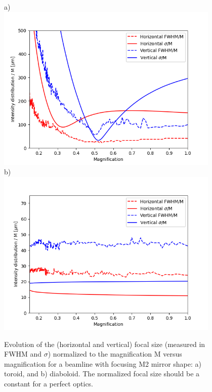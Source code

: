 \documentclass{iucr}              %
\begin{document}
\begin{figure}\label{fig:scan}
\flushleft
a)\\
\centering
\includegraphics[width=0.95\textwidth]{figures/scan_toroid.png}\\
\flushleft
b)\\
\centering
\includegraphics[width=0.95\textwidth]{figures/scan_diaboloid.png}\\

\caption{
Evolution of the (horizontal and vertical) focal size (measured in FWHM and $\sigma$) normalized to the magnification M versus magnification for a beamline with focusing M2 mirror shape: a) toroid, and b) diaboloid. The normalized focal size should be a constant for a perfect optics.
}
\end{figure}
\end{document}
